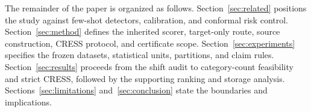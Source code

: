 The remainder of the paper is organized as follows. Section~\ref{sec:related} positions the study against few-shot detectors, calibration, and conformal risk control. Section~\ref{sec:method} defines the inherited scorer, target-only route, source construction, CRESS protocol, and certificate scope. Section~\ref{sec:experiments} specifies the frozen datasets, statistical units, partitions, and claim rules. Section~\ref{sec:results} proceeds from the shift audit to category-count feasibility and strict CRESS, followed by the supporting ranking and storage analysis. Sections~\ref{sec:limitations} and~\ref{sec:conclusion} state the boundaries and implications.
